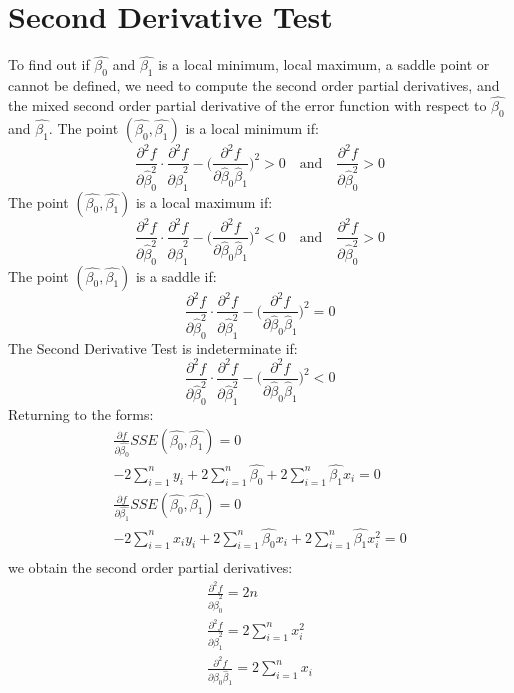 \documentclass{article}
\begin{document}
\section*{Second Derivative Test}

To find out if $\hat{\beta_0}$ and $\hat{\beta_1}$ is a local minimum, local maximum, a saddle point or cannot be defined, we need to compute the second order partial derivatives, and the mixed second order partial derivative of the error function with respect to  $\hat{\beta_0}$ and $\hat{\beta_1}$. The point $(\hat{\beta_{0}}, \hat{\beta_{1}})$ is a local minimum if:
$$
\frac{\partial^2f}{\partial \hat{\beta}_{0}^2} \cdot \frac{\partial^2f}{\partial \hat{\beta}_{1}^2} - \Bigg( \frac{\partial^2f}{\partial \hat{\beta}_{0} \hat{\beta}_{1}}\Bigg)^2 > 0  \quad \textrm{and} \quad \frac{\partial^2f}{\partial \hat{\beta}_{0}^2} > 0
$$
The point $(\hat{\beta_{0}}, \hat{\beta_{1}})$ is a local maximum if:
$$
\frac{\partial^2f}{\partial \hat{\beta}_{0}^2} \cdot \frac{\partial^2f}{\partial \hat{\beta}_{1}^2} - \Bigg( \frac{\partial^2f}{\partial \hat{\beta}_{0} \hat{\beta}_{1}}\Bigg)^2 < 0  \quad \textrm{and} \quad \frac{\partial^2f}{\partial \hat{\beta}_{0}^2} > 0
$$
The point $(\hat{\beta_{0}}, \hat{\beta_{1}})$ is a saddle if:
$$
\frac{\partial^2f}{\partial \hat{\beta}_{0}^2} \cdot \frac{\partial^2f}{\partial \hat{\beta}_{1}^2} - \Bigg( \frac{\partial^2f}{\partial \hat{\beta}_{0} \hat{\beta}_{1}}\Bigg)^2 = 0 
$$
The Second Derivative Test is indeterminate if:
$$
\frac{\partial^2f}{\partial \hat{\beta}_{0}^2} \cdot \frac{\partial^2f}{\partial \hat{\beta}_{1}^2} - \Bigg( \frac{\partial^2f}{\partial \hat{\beta}_{0} \hat{\beta}_{1}}\Bigg)^2 < 0 
$$
Returning to the forms:
\begin{gather*}
\frac{\partial f}{\partial \hat{\beta_0}}SSE(\hat{\beta_0}, \hat{\beta_1}) = 0 \\
 -2\sum_{i=1}^{n}y_i  + 2\sum_{i=1}^{n}\hat{\beta_{0}} + 2\sum_{i=1}^{n}\hat{\beta_{1}}x_i  = 0 \\
 \frac{\partial f}{\partial \hat{\beta_1}}SSE(\hat{\beta_0}, \hat{\beta_1}) = 0 \\
 -2\sum_{i=1}^{n}x_i y_i + 2\sum_{i=1}^{n}\hat{\beta_{0}}x_i + 2\sum_{i=1}^{n}\hat{\beta_{1}}x_i^2 = 0 \\
\end{gather*}
we obtain the second order partial derivatives:
\begin{gather*}
\frac{\partial^2f}{\partial \hat{\beta}_{0}^2} = 2n \\
\frac{\partial^2f}{\partial \hat{\beta}_{1}^2} = 2\sum_{i=1}^{n}x_i^2 \\
\frac{\partial^2f}{\partial \hat{\beta}_{0} \hat{\beta}_{1}} = 2\sum_{i=1}^{n}x_i \\
\end{gather*}
\end{document}
